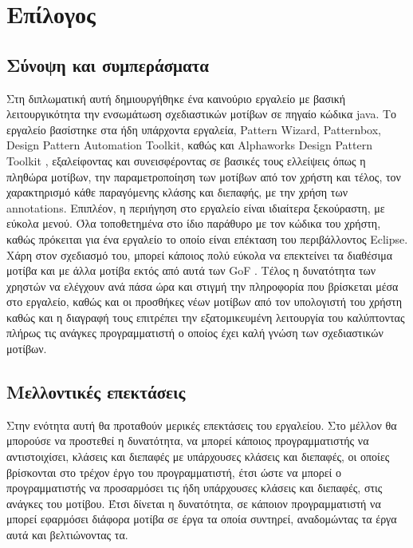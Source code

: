 \chapter{Επίλογος}
\label{ch:epilogue}
\section{Σύνοψη και συμπεράσματα}
\label{sec:conclusion}
Στη διπλωματική αυτή δημιουργήθηκε ένα καινούριο εργαλείο 
με βασική λειτουργικότητα την ενσωμάτωση σχεδιαστικών μοτίβων σε πηγαίο κώδικα java. 
Το εργαλείο βασίστηκε στα ήδη υπάρχοντα εργαλεία, Pattern Wizard, Patternbox, Design Pattern Automation Toolkit, καθώς και 
Alphaworks Design Pattern Toolkit \cite{PatternBox}, εξαλείφοντας  και συνεισφέροντας  σε βασικές 
τους ελλείψεις όπως η πληθώρα μοτίβων, την παραμετροποίηση των μοτίβων από τον χρήστη και τέλος, τον χαρακτηρισμό 
κάθε παραγόμενης κλάσης και διεπαφής, με την χρήση των annotations. Επιπλέον, η περιήγηση στο εργαλείο είναι ιδιαίτερα ξεκούραστη, 
με εύκολα μενού. Όλα τοποθετημένα στο ίδιο παράθυρο με τον κώδικα του χρήστη, καθώς πρόκειται για ένα εργαλείο το οποίο 
είναι επέκταση του περιβάλλοντος Eclipse.
Χάρη στον σχεδιασμό του, μπορεί κάποιος πολύ εύκολα να επεκτείνει τα διαθέσιμα μοτίβα 
και με άλλα μοτίβα εκτός από αυτά των GoF \cite{GoF}. Τέλος η δυνατότητα των χρηστών να ελέγχουν ανά πάσα ώρα και στιγμή 
την πληροφορία που βρίσκεται μέσα στο εργαλείο, καθώς και οι προσθήκες  νέων μοτίβων από τον υπολογιστή του χρήστη καθώς 
και η διαγραφή τους επιτρέπει την εξατομικευμένη λειτουργία του καλύπτοντας πλήρως τις ανάγκες 
προγραμματιστή ο οποίος έχει καλή γνώση των σχεδιαστικών μοτίβων.
\section{Μελλοντικές επεκτάσεις}
\label{sec:features}
Στην ενότητα αυτή θα προταθούν μερικές επεκτάσεις του εργαλείου. Στο μέλλον θα μπορούσε να προστεθεί η δυνατότητα, 
να μπορεί κάποιος προγραμματιστής να αντιστοιχίσει, κλάσεις και διεπαφές με υπάρχουσες κλάσεις και διεπαφές, 
οι οποίες βρίσκονται στο τρέχον έργο του προγραμματιστή, έτσι ώστε να μπορεί ο προγραμματιστής να προσαρμόσει 
τις ήδη υπάρχουσες κλάσεις και διεπαφές, στις ανάγκες του μοτίβου. Έτσι δίνεται η δυνατότητα, 
σε κάποιον προγραμματιστή να μπορεί εφαρμόσει διάφορα μοτίβα σε έργα τα οποία συντηρεί, 
αναδομώντας τα έργα αυτά και βελτιώνοντας τα.
